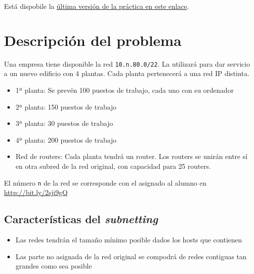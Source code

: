 \documentclass[a4paper]{article}
\begin{document}
Está dispobile la \href{https://alvarogonzalezsotillo.github.io/apuntes-clase/planificacion-administracion-redes-asir1/apuntes/4/par-4-practica-ip-packetracer.pdf}{última versión de la práctica en este enlace}.



\section{Descripción del problema}
\label{sec:org0000009}
Una empresa tiene disponible la red \texttt{10.n.80.0/22}. La utilizará para dar servicio a un nuevo edificio con 4 plantas. Cada planta pertenecerá a una red IP distinta.
\begin{itemize}
\item 1ª planta: Se prevén 100 puestos de trabajo, cada uno con su ordenador
\item 2ª planta: 150 puestos de trabajo
\item 3ª planta: 30 puestos de trabajo
\item 4ª planta: 200 puestos de trabajo
\item Red de routers: Cada planta tendrá un router. Los routers se unirán entre sí en otra subred de la red original, con capacidad para 25 routers.
\end{itemize}


El número \texttt{n} de la red se corresponde con el asignado al alumno en  \href{http://bit.ly/2sji9gQ}{http://bit.ly/2sji9gQ}

\subsection{Características del \emph{subnetting}}
\label{sec:org0000003}
\begin{itemize}
\item Las redes tendrán el tamaño mínimo posible dados los hosts que contienen
\item Las parte no asignada de la red original se compodrá de redes contiguas tan grandes como sea posible
\end{itemize}
\end{document}
